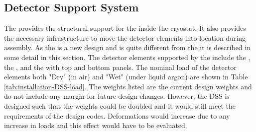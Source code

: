 \subsection{Detector Support System}
\label{sec:fdsp-tc-infr-dss}

The  provides the structural support for the  inside the cryostat.  
It also provides the necessary infrastructure to move the detector elements into location during
assembly. 
As the  is a new design and is quite different from the   it is described in some detail in this
section. 
The detector elements supported by the  include the , the , and the  with top and bottom  panels. The nominal load of the detector elements both "Dry" (in air) and "Wet" (under liquid argon) are shown in Table \ref{tab:installation-DSS-load}. The weights listed are the current design weights and do not include any margin for future design changes.  
However, the DSS is designed such that the weights could be doubled and it would still meet the requirements of the design codes.  
Deformations would increase due to any increase in loads and this effect would have to be evaluated.
